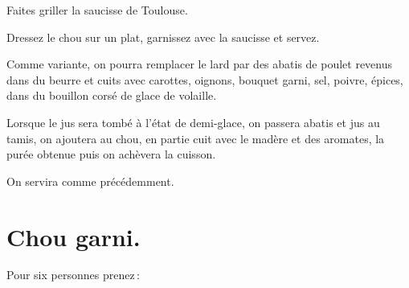 Faites griller la saucisse de Toulouse.

Dressez le chou sur un plat, garnissez avec la saucisse et servez.

\sk

Comme variante, on pourra remplacer le lard par des abatis de poulet revenus
dans du beurre et cuits avec carottes, oignons, bouquet garni, sel, poivre,
épices, dans du bouillon corsé de glace de volaille.

Lorsque le jus sera tombé à l’état de demi-glace, on passera abatis et jus au
tamis, on ajoutera au chou, en partie cuit avec le madère et des aromates, la
purée obtenue puis on achèvera la cuisson.

On servira comme précédemment.

\section*{\centering Chou garni.}
{}

Pour six personnes prenez :

